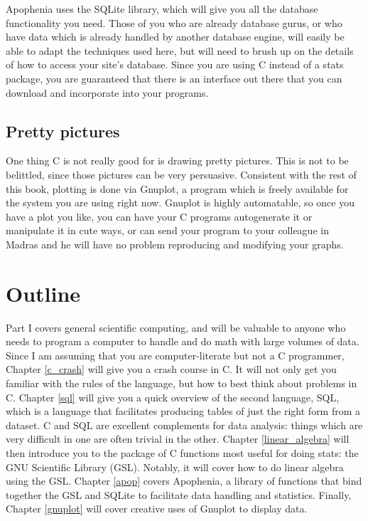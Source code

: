 \documentclass[12pt,notitlepage, openany]{book}
\def\ind#1{\index{#1}#1}
\begin{document}
Apophenia  uses the \ind{SQLite} library, which will
give you all the database functionality you need. Those of you who are
already database gurus, or who have data which is already handled
by another database engine, will easily be able to adapt the techniques
used here, but will need to brush up on the details of how to access
your site's database. Since you are using C instead of a stats package,
you are guaranteed that there is an interface out there that you can
download and incorporate into your programs.

\subsection{Pretty pictures} One thing C is not really good for is drawing
pretty pictures. This is not to be belittled, since those pictures
can be very persuasive. Consistent with the rest of this book, plotting
is done via \ind{Gnuplot}, a program which is freely available for
the system you are using right now. Gnuplot is highly automatable, so once
you have a plot you like, you can have your C programs autogenerate
it or manipulate it in cute ways, or can send your program to your
colleague in Madras and he will have no problem reproducing and modifying
your graphs.




\section{Outline} 
Part I covers general scientific computing, and will be valuable to
anyone who needs to program a computer to handle and do math with large volumes of data.
Since I am assuming that you are computer-literate but
not a C programmer, Chapter \ref{c_crash} will give you a crash course
in C. It will not only get you familiar with the rules of the language,
but how to best think about problems in C. 
Chapter \ref{sql} will give you a quick overview of the second language,
SQL, which is a language that facilitates
producing tables of just the right form from a dataset. C and SQL are
excellent complements for data analysis: things which are very difficult
in one are often trivial in the other.
Chapter \ref{linear_algebra}
will then introduce you to the package of C functions most useful for
doing stats: the GNU Scientific Library (GSL). Notably, it will cover
how to do linear algebra using the GSL. Chapter \ref{apop} covers
Apophenia, a library of functions that bind together the GSL and SQLite
to facilitate data handling and statistics. Finally, Chapter
\ref{gnuplot} will cover creative uses of Gnuplot to display data.
\end{document}
